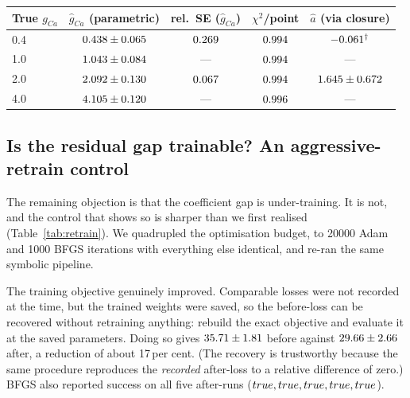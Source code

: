 \documentclass{article}
\newcommand{\AdamRe}{20000}    %
\newcommand{\BfgsRe}{1000}     %
\newcommand{\gcaMain}{2.0}     %
\newcommand{\gcaPhys}{0.4}     %
\newcommand{\gcaMid}{1.0}      %
\newcommand{\gcaHi}{4.0}       %
\newcommand{\LossDropPct}{17}
\begin{document}
\begin{table}[t]
\begin{tabular}{lcccc}
    \toprule
    True $g_{Ca}$ & $\hat g_{Ca}$ (parametric) & rel.\ SE ($\hat g_{Ca}$) & $\chi^2$/point
      & $\hat a$ (via closure) \\
    \midrule
    \gcaPhys & $0.438 \pm 0.065$ & $0.269$ & $0.994$ & $-0.061^{\dagger}$ \\
    \gcaMid  & $1.043 \pm 0.084$ & --- & $0.994$ & --- \\
    \gcaMain & $2.092 \pm 0.130$ & $0.067$ & $0.994$ & $1.645 \pm 0.672$ \\
    \gcaHi   & $4.105 \pm 0.120$ & --- & $0.996$ & --- \\
    \bottomrule
  \end{tabular}
\end{table}

\subsection{Is the residual gap trainable? An aggressive-retrain control}
\label{sec:results-retrain}

The remaining objection is that the coefficient gap is under-training. It is not,
and the control that shows so is sharper than we first realised
(Table~\ref{tab:retrain}). We quadrupled the optimisation budget, to \AdamRe{}
Adam and \BfgsRe{} BFGS iterations with everything else identical, and re-ran
the same symbolic pipeline.

The training objective genuinely improved. Comparable losses were not recorded at
the time, but the trained weights were saved, so the before-loss can be recovered
without retraining anything: rebuild the exact objective and evaluate it at the
saved parameters. Doing so gives $35.71 \pm 1.81$ before against
$29.66 \pm 2.66$ after, a reduction of about \LossDropPct\,per cent.
(The recovery is trustworthy because the same procedure reproduces the
\emph{recorded} after-loss to a relative difference of zero.) BFGS also reported
success on all five after-runs ($true, true, true, true, true$).
\end{document}

